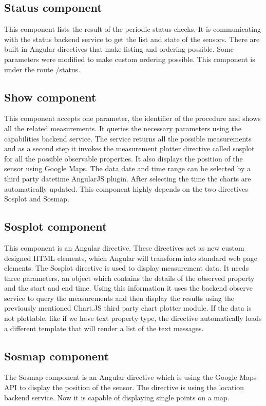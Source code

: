 \subsection{Status component}

This component lists the result of the periodic status checks. 
It is communicating with the status backend service to get the list and state of the sensors.
There are built in Angular directives that make listing and ordering possible. Some parameters were modified to make custom ordering possible. This component is under the route /status.

\subsection{Show component}

This component accepts one parameter, the identifier of the procedure and shows all the related measurements. It queries the necessary parameters using the capabilities backend service. The service returns all the possible measurements and as a second step it invokes the measurement plotter directive called sosplot for all the possible observable properties.
It also displays the position of the sensor using Google Maps. 
The data date and time range can be selected by a third party datetime AngularJS plugin. After selecting the time the charts are automatically updated. This component highly depends on the two directives Sosplot and Sosmap.

\subsection{Sosplot component}
This component is an Angular directive. These directives act as new custom designed HTML elements, which Angular will transform into standard web page elements. The Sosplot directive is used to display measurement data. It needs three parameters, an object which contains the details of the observed property and the start and end time. Using this information it uses the backend observe service to query the measurements and then display the results using the previously mentioned Chart.JS third party chart plotter module. If the data is not plottable, like if we have text property type, the directive automatically loads a different template that will render a list of the text messages. 

\subsection{Sosmap component}
The Sosmap component is an Angular directive which is using the Google Maps API to display the position of the sensor. The directive is using the location backend service. Now it is capable of displaying single points on a map.


